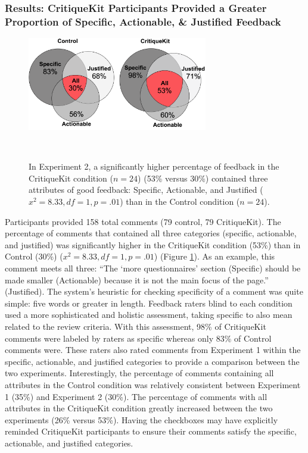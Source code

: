 \subsubsection{Results: CritiqueKit Participants Provided a Greater Proportion of Specific, Actionable, \& Justified Feedback}
\begin{figure}[b!]
\centering
  \includegraphics[width=0.7\textwidth]{critiquekit/figures/venn_diagram_exp2.png}
  \caption{In Experiment 2, a significantly higher percentage of feedback in the CritiqueKit condition ($n=24$) (53\% versus 30\%) contained three attributes of good feedback: Specific, Actionable, and Justified ($x^2=8.33, df = 1, p = .01$) than in the Control condition ($n=24$).}~\label{fig:critiquekit_exp2}
\end{figure}

Participants provided 158 total comments (79 control, 79 CritiqueKit). The percentage of comments that contained all three categories (specific, actionable, and justified) was significantly higher in the CritiqueKit condition (53\%) than in Control (30\%) ($x^2=8.33, df = 1, p = .01$) (Figure \ref{fig:critiquekit_exp2}). As an example, this comment meets all three: ``The `more questionnaires' section (Specific) should be made smaller (Actionable) because it is not the main focus of the page.'' (Justified). The system's heuristic for checking specificity of a comment was quite simple: five words or greater in length. Feedback raters blind to each condition used a more sophisticated and holistic assessment, taking specific to also mean related to the review criteria. With this assessment, 98\% of CritiqueKit comments were labeled by raters as specific whereas only 83\% of Control comments were. These raters also rated comments from Experiment 1 within the specific, actionable, and justified categories to provide a comparison between the two experiments. Interestingly, the percentage of comments containing all attributes in the Control condition was relatively consistent between Experiment 1 (35\%) and Experiment 2 (30\%). The percentage of comments with all attributes in the CritiqueKit condition greatly increased between the two experiments (26\% versus 53\%). Having the checkboxes may have explicitly reminded CritiqueKit participants to ensure their comments satisfy the specific, actionable, and justified categories.

